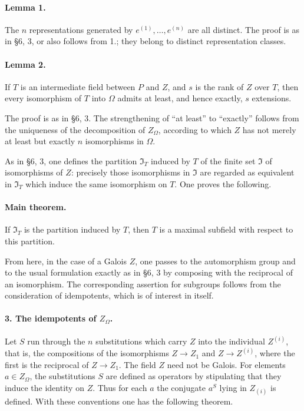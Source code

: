\documentclass[11pt]{article}
\begin{document}
\paragraph{Lemma 1.}
The \(n\) representations generated by \(e^{(1)},\ldots,e^{(n)}\) are all distinct. The proof is as in §6, 3, or also follows from 1.; they belong to distinct representation classes.

\paragraph{Lemma 2.}
If \(T\) is an intermediate field between \(P\) and \(Z\), and \(s\) is the rank of \(Z\) over \(T\), then every isomorphism of \(T\) into \(\Omega\) admits at least, and hence exactly, \(s\) extensions.

The proof is as in §6, 3. The strengthening of “at least” to “exactly” follows from the uniqueness of the decomposition of \(Z_\Omega\), according to which \(Z\) has not merely at least but exactly \(n\) isomorphisms in \(\Omega\).

As in §6, 3, one defines the partition \(\mathfrak I_T\) induced by \(T\) of the finite set \(\mathfrak I\) of isomorphisms of \(Z\): precisely those isomorphisms in \(\mathfrak I\) are regarded as equivalent in \(\mathfrak I_T\) which induce the same isomorphism on \(T\). One proves the following.

\paragraph{Main theorem.}
If \(\mathfrak I_T\) is the partition induced by \(T\), then \(T\) is a maximal subfield with respect to this partition.

From here, in the case of a Galois \(Z\), one passes to the automorphism group and to the usual formulation exactly as in §6, 3 by composing with the reciprocal of an isomorphism. The corresponding assertion for subgroups follows from the consideration of idempotents, which is of interest in itself.

\paragraph{3. The idempotents of \(Z_\Omega\).}
Let \(S\) run through the \(n\) substitutions which carry \(Z\) into the individual \(Z^{(i)}\), that is, the compositions of the isomorphisms \(Z\to Z_1\) and \(Z\to Z^{(i)}\), where the first is the reciprocal of \(Z\to Z_1\). The field \(Z\) need not be Galois. For elements \(a\in Z_\Omega\), the substitutions \(S\) are defined as operators by stipulating that they induce the identity on \(Z\). Thus for each \(a\) the conjugate \(a^S\) lying in \(Z_{(i)}\) is defined. With these conventions one has the following theorem.
\end{document}
